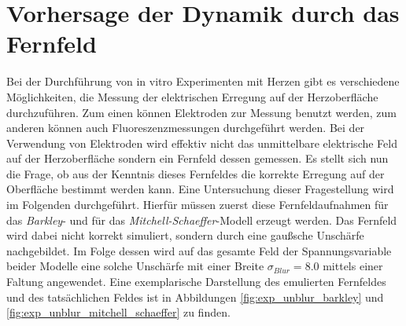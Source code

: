 \clearpage
\section{Vorhersage der Dynamik durch das Fernfeld}
\label{sec:exp_unblur}
Bei der Durchführung von in vitro Experimenten mit Herzen gibt es verschiedene Möglichkeiten, die Messung der elektrischen Erregung auf der Herzoberfläche durchzuführen. Zum einen können Elektroden zur Messung benutzt werden, zum anderen können auch Fluoreszenzmessungen durchgeführt werden. Bei der Verwendung von Elektroden wird effektiv nicht das unmittelbare elektrische Feld auf der Herzoberfläche sondern ein Fernfeld dessen gemessen. Es stellt sich nun die Frage, ob aus der Kenntnis dieses Fernfeldes die korrekte Erregung auf der Oberfläche bestimmt werden kann. Eine Untersuchung dieser Fragestellung wird im Folgenden durchgeführt. Hierfür müssen zuerst diese Fernfeldaufnahmen für das \textit{Barkley}- und für das \textit{Mitchell-Schaeffer}-Modell erzeugt werden. Das Fernfeld wird dabei nicht korrekt simuliert, sondern durch eine gaußsche Unschärfe nachgebildet. Im Folge dessen wird auf das gesamte Feld der Spannungsvariable beider Modelle eine solche Unschärfe mit einer Breite $\sigma_{Blur} = 8.0$ mittels einer Faltung angewendet. Eine exemplarische Darstellung des emulierten Fernfeldes und des tatsächlichen Feldes ist in Abbildungen \ref{fig:exp_unblur_barkley} und \ref{fig:exp_unblur_mitchell_schaeffer} zu finden.

